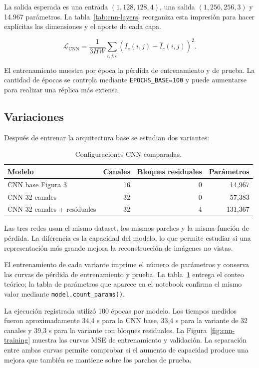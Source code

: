 \documentclass[11pt,a4paper]{article}
\begin{document}
La salida esperada es una entrada $(1,128,128,4)$, una salida $(1,256,256,3)$ y 14.967 parámetros. La tabla~\ref{tab:cnn-layers} reorganiza esta impresión para hacer explícitas las dimensiones y el aporte de cada capa.

\begin{equation}
    \mathcal{L}_{\mathrm{CNN}}=
    \frac{1}{3HW}\sum_{i,j,c}
    \left(I_c(i,j)-\hat I_c(i,j)\right)^2.
    \label{eq:loss-cnn}
\end{equation}

El entrenamiento muestra por época la pérdida de entrenamiento y de prueba. La cantidad de épocas se controla mediante \texttt{EPOCHS\_BASE=100} y puede aumentarse para realizar una réplica más extensa.

\subsection{Variaciones}

Después de entrenar la arquitectura base se estudian dos variantes:

\begin{table}[H]
\centering
\caption{Configuraciones CNN comparadas.}
\label{tab:cnn-variants}
\begin{tabular}{lrrr}
\toprule
Modelo & Canales & Bloques residuales & Parámetros\\
\midrule
CNN base Figura 3 & 16 & 0 & 14,967\\
CNN 32 canales & 32 & 0 & 57,383\\
CNN 32 canales + residuales & 32 & 4 & 131,367\\
\bottomrule
\end{tabular}
\end{table}

Las tres redes usan el mismo dataset, los mismos parches y la misma función de pérdida. La diferencia es la capacidad del modelo, lo que permite estudiar si una representación más grande mejora la reconstrucción de imágenes no vistas.

El entrenamiento de cada variante imprime el número de parámetros y conserva las curvas de pérdida de entrenamiento y prueba. La tabla~\ref{tab:cnn-variants} entrega el conteo teórico; la tabla de parámetros que aparece en el notebook confirma el mismo valor mediante \texttt{model.count\_params()}.

La ejecución registrada utilizó 100 épocas por modelo. Los tiempos medidos fueron aproximadamente 34,4 s para la CNN base, 33,4 s para la variante de 32 canales y 39,3 s para la variante con bloques residuales. La Figura~\ref{fig:cnn-training} muestra las curvas MSE de entrenamiento y validación. La separación entre ambas curvas permite comprobar si el aumento de capacidad produce una mejora que también se mantiene sobre los parches de prueba.
\end{document}
